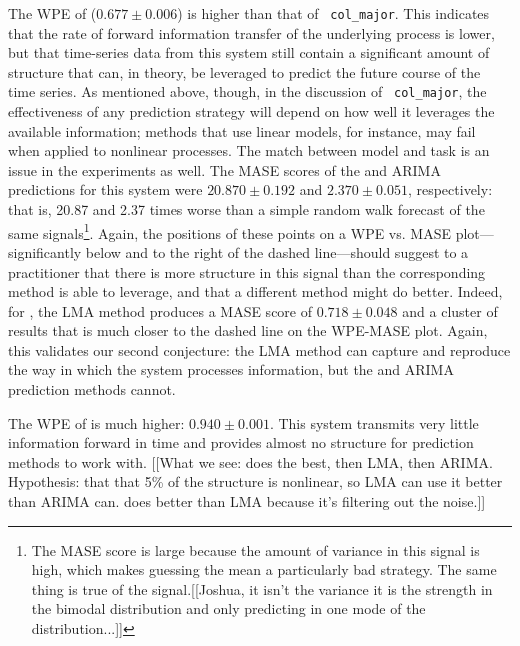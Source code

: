 The WPE of \svdfive ($0.677 \pm 0.006$) is higher than that of {\tt
  col\_major}.  This indicates that the rate of forward information
transfer of the underlying process is lower, but that time-series data
from this system still contain a significant amount of structure that
can, in theory, be leveraged to predict the future course of the time
series.  As mentioned above, though, in the discussion of {\tt
  col\_major}, the effectiveness of any prediction strategy will
depend on how well it leverages the available information; methods
that use linear models, for instance, may fail when applied to
nonlinear processes.
% 
% 
The match between model and task is an issue in the \svdfive
experiments as well.  The MASE scores of the \naive and ARIMA
predictions for this system were $20.870 \pm 0.192$ and $2.370 \pm
0.051$, respectively: that is, 20.87 and 2.37 times worse than a
simple random walk forecast of the same signals\footnote{The \naive
  MASE score is large because the amount of variance in this signal is
  high, which makes guessing the mean a particularly bad strategy.
  The same thing is true of the \svdthree signal.[[Joshua, it isn't the variance it is the strength in the bimodal distribution and only predicting in one mode of the distribution...]]}.  Again, the
positions of these points on a WPE vs. MASE plot---significantly below
and to the right of the dashed line---should suggest to a practitioner
that there is more structure in this signal than the corresponding
method is able to leverage, and that a different method might do
better.  Indeed, for \svdfive, the LMA method produces a MASE score of
$ 0.718\pm 0.048 $ and a cluster of results that is much closer to the
dashed line on the WPE-MASE plot.  Again, this validates our second
conjecture: the LMA method can capture and reproduce the way in which
the \svdfive system processes information, but the \naive and ARIMA
prediction methods cannot.

The WPE of \gcc is much higher: $0.940 \pm 0.001$.  This system
transmits very little information forward in time and provides almost
no structure for prediction methods to work with.  [[What we see:
    \naive does the best, then LMA, then ARIMA.  Hypothesis: that that
    5\% of the structure is nonlinear, so LMA can use it better than
    ARIMA can.  \naive does better than LMA because it's filtering out
    the noise.]]

